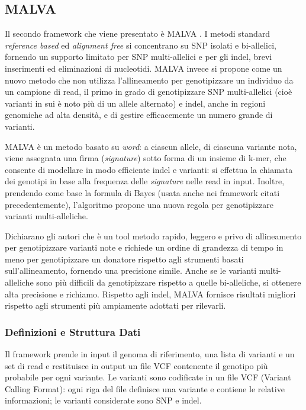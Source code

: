 \documentclass[../main.tex]{subfiles}
\begin{document}
\subsection{MALVA}
\label{malva}

Il secondo framework che viene presentato è MALVA \cite{bernardini2019malva}. I metodi standard \textit{reference based} ed \textit{alignment free} si concentrano su SNP isolati e bi-allelici, fornendo un supporto limitato per SNP multi-allelici e per gli indel, brevi inserimenti ed eliminazioni di nucleotidi. MALVA invece si propone come un nuovo metodo che non utilizza l'allineamento per genotipizzare un individuo da un campione di read, il primo in grado di genotipizzare SNP multi-allelici (cioè varianti in sui è noto più di un allele alternato) e indel, anche in regioni genomiche ad alta densità, e di gestire efficacemente un numero grande di varianti. 

MALVA è un metodo basato su \textit{word}: a ciascun allele, di ciascuna variante nota, viene assegnata una firma (\textit{signature}) sotto forma di un insieme di k-mer, che consente di modellare in modo efficiente indel e varianti: si effettua la chiamata dei genotipi in base alla frequenza delle \textit{signature} nelle read in input. Inoltre, prendendo come base la formula di Bayes (usata anche nei framework citati precedentemente), l'algoritmo propone una nuova regola per genotipizzare varianti multi-alleliche.

Dichiarano gli autori che è un tool metodo rapido, leggero e privo di allineamento per genotipizzare varianti note e richiede un ordine di grandezza di tempo in meno per genotipizzare un donatore rispetto agli strumenti basati sull'allineamento, fornendo una precisione simile. Anche se le varianti multi-alleliche sono più difficili da genotipizzare rispetto a quelle bi-alleliche, si ottenere alta precisione e richiamo. Rispetto agli indel, MALVA fornisce risultati migliori rispetto agli strumenti più ampiamente adottati per rilevarli. 


\subsubsection{Definizioni e Struttura Dati}

Il framework prende in input il genoma di riferimento, una lista di varianti e un set di read e restituisce in output un file VCF contenente il genotipo più probabile per ogni variante. Le varianti sono codificate in un file VCF (Variant Calling Format): ogni riga del file definisce una variante e contiene le relative informazioni; le varianti considerate sono SNP e indel.
\end{document}
